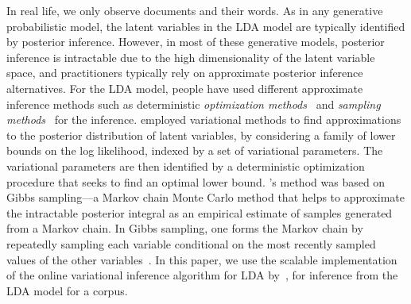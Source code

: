 In real life, we only observe documents and their words. 
As in any generative probabilistic model, the latent variables in 
the LDA model are typically identified by posterior inference. 
However, in most of these generative models, posterior inference is 
intractable due to the high dimensionality of the latent variable 
space, and practitioners typically rely on approximate posterior 
inference alternatives. For the LDA model, people have used 
different approximate inference methods such as deterministic 
\textsl{optimization methods}~\cite{Blei2003} and \textsl{sampling 
methods}~\cite{Griffiths2004} for the inference. 
\citeauthor{Blei2003} employed variational methods to find 
approximations to the posterior distribution of latent variables, by 
considering a family of lower bounds on the log likelihood, indexed 
by a set of variational parameters. The variational parameters are 
then identified by a deterministic optimization procedure that seeks 
to find an optimal lower bound. \citeauthor{Griffiths2004}'s method 
was based on Gibbs sampling---a Markov chain Monte Carlo 
method that helps to approximate the intractable posterior integral 
as an empirical estimate of samples generated from a Markov chain.   
In Gibbs sampling, one forms the Markov chain by repeatedly sampling 
each variable conditional on the most recently sampled values of the 
other variables~\cite{Geman1984}. In this paper, we use the scalable 
implementation of the online variational inference algorithm for LDA
\cite{hoffman2010online} by~\cite{rehurek_lrec}, for inference from 
the LDA model for a corpus. 


